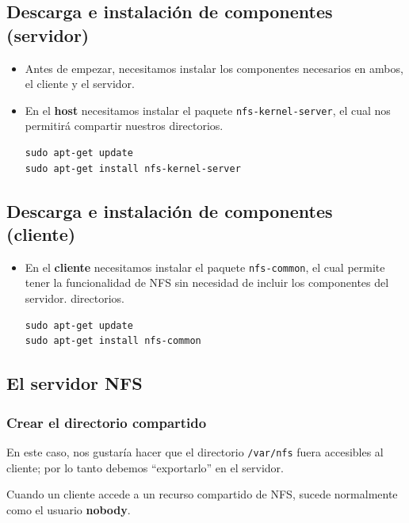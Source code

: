 \documentclass[a4paper,11pt]{article}
\begin{document}
\subsection{Descarga e instalación de componentes (servidor)}
\begin{itemize}
\item Antes de empezar, necesitamos instalar los componentes necesarios en
      ambos, el cliente y el servidor.
\item En el \textbf{host} necesitamos instalar el paquete
\texttt{nfs-kernel-server}, el cual nos permitirá compartir nuestros
directorios.
\begin{verbatim}
sudo apt-get update
sudo apt-get install nfs-kernel-server
\end{verbatim}
\end{itemize}

\subsection{Descarga e instalación de componentes (cliente)}
\begin{itemize}
\item En el \textbf{cliente} necesitamos instalar el paquete
            \texttt{nfs-common}, el cual permite tener la funcionalidad de NFS
            sin necesidad de incluir los componentes del servidor.
            directorios.
\begin{verbatim}
sudo apt-get update
sudo apt-get install nfs-common

\end{verbatim}
\end{itemize}

\subsection{El servidor NFS}
\subsubsection{Crear el directorio compartido}
En este caso, nos gustaría hacer que el directorio \texttt{/var/nfs} fuera
accesibles al cliente; por lo tanto  debemos ``exportarlo'' en el servidor.

Cuando un cliente accede a un recurso compartido de NFS, sucede normalmente como
el usuario \textbf{nobody}. 
\end{document}
